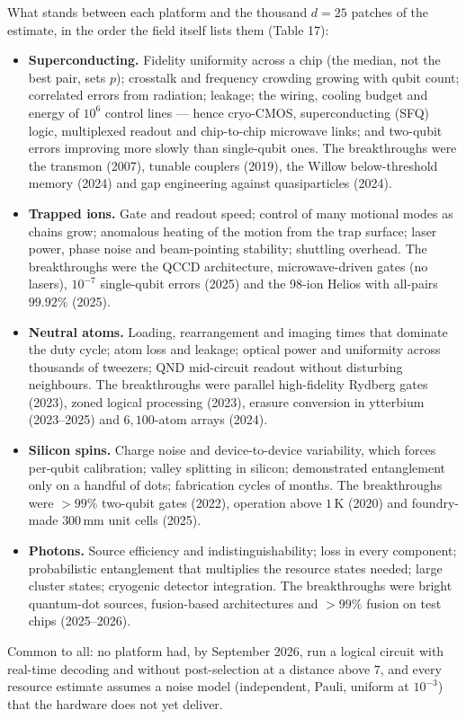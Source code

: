 What stands between each platform and the thousand $d=25$ patches of the estimate, in the
order the field itself lists them \cite{ph:uqt26} (Table 17):
\begin{itemize}\setlength\itemsep{2pt}
\item \textbf{Superconducting.} Fidelity uniformity across a chip (the median, not the best
  pair, sets $p$); crosstalk and frequency crowding growing with qubit count; correlated errors
  from radiation; leakage; the wiring, cooling budget and energy of $10^6$ control lines ---
  hence cryo-CMOS, superconducting (SFQ) logic, multiplexed readout and chip-to-chip microwave
  links; and two-qubit errors improving more slowly than single-qubit ones. The breakthroughs
  were the transmon (2007), tunable couplers (2019), the Willow below-threshold memory (2024) and
  gap engineering against quasiparticles (2024).
\item \textbf{Trapped ions.} Gate and readout speed; control of many motional modes as chains
  grow; anomalous heating of the motion from the trap surface; laser power, phase noise and
  beam-pointing stability; shuttling overhead. The breakthroughs were the QCCD architecture,
  microwave-driven gates (no lasers), $10^{-7}$ single-qubit errors (2025) and the 98-ion Helios
  with all-pairs $99.92\%$ (2025).
\item \textbf{Neutral atoms.} Loading, rearrangement and imaging times that dominate the duty
  cycle; atom loss and leakage; optical power and uniformity across thousands of tweezers;
  QND mid-circuit readout without disturbing neighbours. The breakthroughs were parallel
  high-fidelity Rydberg gates (2023), zoned logical processing (2023), erasure conversion in
  ytterbium (2023--2025) and $6,100$-atom arrays (2024).
\item \textbf{Silicon spins.} Charge noise and device-to-device variability, which forces
  per-qubit calibration; valley splitting in silicon; demonstrated entanglement only on a
  handful of dots; fabrication cycles of months. The breakthroughs were $>99\%$ two-qubit gates
  (2022), operation above $1$\,K (2020) and foundry-made $300$\,mm unit cells (2025).
\item \textbf{Photons.} Source efficiency and indistinguishability; loss in every component;
  probabilistic entanglement that multiplies the resource states needed; large cluster states;
  cryogenic detector integration. The breakthroughs were bright quantum-dot sources, fusion-based
  architectures and $>99\%$ fusion on test chips (2025--2026).
\end{itemize}
Common to all: no platform had, by September 2026, run a logical circuit with real-time decoding
and without post-selection at a distance above $7$, and every resource estimate assumes a noise
model (independent, Pauli, uniform at $10^{-3}$) that the hardware does not yet deliver.

